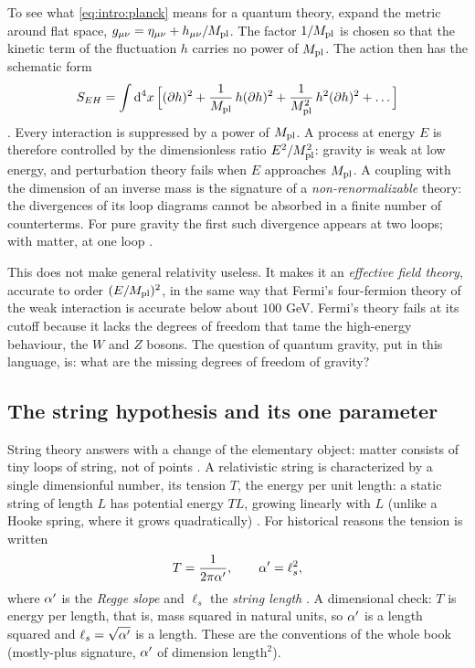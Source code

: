 To see what \cref{eq:intro:planck} means for a quantum theory, expand the metric around flat
space, $g_{\mu\nu}=\eta_{\mu\nu}+h_{\mu\nu}/M_{\rm pl}$. The factor $1/M_{\rm pl}$ is chosen so
that the kinetic term of the fluctuation $h$ carries no power of $M_{\rm pl}$. The action then
has the schematic form
\begin{equation}\label{eq:intro:expansion}
  S_{EH}=\int \mathrm{d}^4x\,\Big[(\partial h)^2+\frac{1}{M_{\rm pl}}\,h(\partial h)^2
  +\frac{1}{M_{\rm pl}^2}\,h^2(\partial h)^2+\dots\Big]
\end{equation}
. Every interaction is suppressed by a power of $M_{\rm pl}$.
A process at energy $E$ is therefore controlled by the dimensionless ratio
$E^2/M_{\rm pl}^2$: gravity is weak at low energy, and perturbation theory fails when $E$
approaches $M_{\rm pl}$. A coupling with the dimension of an inverse mass is the signature of
a \emph{non-renormalizable} theory: the divergences of its loop
diagrams cannot be absorbed in a finite number of counterterms. For pure gravity the first
such divergence appears at two loops; with matter, at one loop
.

This does not make general relativity useless. It makes it an \emph{effective field theory},
accurate to order $(E/M_{\rm pl})^2$, in the same way that Fermi's four-fermion theory of the
weak interaction is accurate below about $100$ GeV. Fermi's theory fails at its cutoff because
it lacks the degrees of freedom that tame the high-energy behaviour, the $W$ and $Z$ bosons.
The question of quantum gravity, put in this language, is: what are the missing degrees of
freedom of gravity? 

\subsection{The string hypothesis and its one parameter}

String theory answers with a change of the elementary object: matter consists of tiny loops
of string, not of points . A relativistic string is
characterized by a single dimensionful number, its tension $T$, the
energy per unit length: a static string of length $L$ has potential energy $TL$, growing
linearly with $L$ (unlike a Hooke spring, where it grows quadratically)
. For historical reasons the tension is written
\begin{equation}\label{eq:intro:tension}
  T=\frac{1}{2\pi\alpha'},\qquad \alpha'=\ell_s^2 ,
\end{equation}
where $\alpha'$ is the \emph{Regge slope} and $\ell_s$ the \emph{string
length} .
A dimensional check: $T$ is energy per length, that is, mass squared in natural units, so
$\alpha'$ is a length squared and $\ell_s=\sqrt{\alpha'}$ is a length. These are the conventions of the
whole book (mostly-plus signature, $\alpha'$ of dimension length$^2$).

